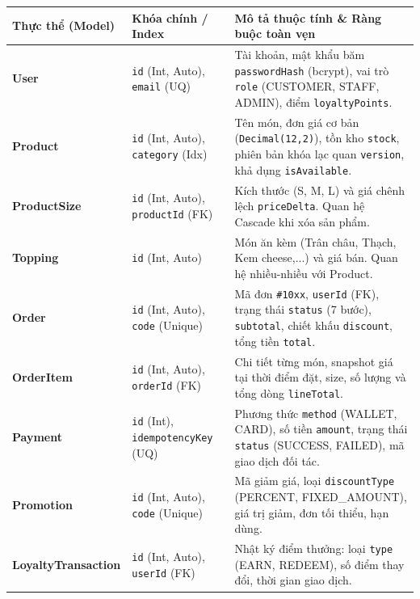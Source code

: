 \documentclass[11pt, a4paper]{article}
\begin{document}
\begin{table}[h!]
	\small
	\centering
	\begin{tabular}{p{2.8cm} p{3.2cm} p{8.5cm}}
		\toprule
		\rowcolor{tableheader}
		\textbf{Thực thể (Model)}   & \textbf{Khóa chính / Index}                      & \textbf{Mô tả thuộc tính \& Ràng buộc toàn vẹn}                                                                                                               \\
		\midrule
		\textbf{User}               & \texttt{id} (Int, Auto), \texttt{email} (UQ)     & Tài khoản, mật khẩu băm \texttt{passwordHash} (bcrypt), vai trò \texttt{role} (CUSTOMER, STAFF, ADMIN), điểm \texttt{loyaltyPoints}.                          \\
		\textbf{Product}            & \texttt{id} (Int, Auto), \texttt{category} (Idx) & Tên món, đơn giá cơ bản (\texttt{Decimal(12,2)}), tồn kho \texttt{stock}, phiên bản khóa lạc quan \texttt{version}, khả dụng \texttt{isAvailable}.            \\
		\textbf{ProductSize}        & \texttt{id} (Int, Auto), \texttt{productId} (FK) & Kích thước (S, M, L) và giá chênh lệch \texttt{priceDelta}. Quan hệ Cascade khi xóa sản phẩm.                                                                 \\
		\textbf{Topping}            & \texttt{id} (Int, Auto)                          & Món ăn kèm (Trân châu, Thạch, Kem cheese,...) và giá bán. Quan hệ nhiều-nhiều với Product.                                                                    \\
		\textbf{Order}              & \texttt{id} (Int, Auto), \texttt{code} (Unique)  & Mã đơn \texttt{\#10xx}, \texttt{userId} (FK), trạng thái \texttt{status} (7 bước), \texttt{subtotal}, chiết khấu \texttt{discount}, tổng tiền \texttt{total}. \\
		\textbf{OrderItem}          & \texttt{id} (Int, Auto), \texttt{orderId} (FK)   & Chi tiết từng món, snapshot giá tại thời điểm đặt, size, số lượng và tổng dòng \texttt{lineTotal}.                                                            \\
		\textbf{Payment}            & \texttt{id} (Int), \texttt{idempotencyKey} (UQ)  & Phương thức \texttt{method} (WALLET, CARD), số tiền \texttt{amount}, trạng thái \texttt{status} (SUCCESS, FAILED), mã giao dịch đối tác.                      \\
		\textbf{Promotion}          & \texttt{id} (Int, Auto), \texttt{code} (Unique)  & Mã giảm giá, loại \texttt{discountType} (PERCENT, FIXED\_AMOUNT), giá trị giảm, đơn tối thiểu, hạn dùng.                                                      \\
		\textbf{LoyaltyTransaction} & \texttt{id} (Int, Auto), \texttt{userId} (FK)    & Nhật ký điểm thưởng: loại \texttt{type} (EARN, REDEEM), số điểm thay đổi, thời gian giao dịch.                                                                \\
		\bottomrule
	\end{tabular}
\end{table}
\end{document}
